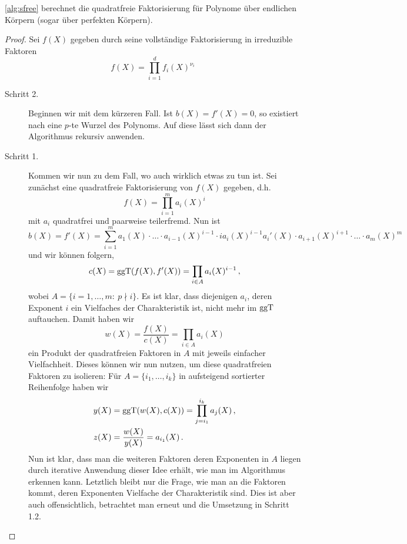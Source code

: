 \begin{thm}
  \autoref{alg:sfree} berechnet die quadratfreie Faktorisierung für Polynome
  über endlichen Körpern (sogar über perfekten Körpern).
\end{thm}
\begin{proof}
  Sei $f(X)$ gegeben durch seine vollständige Faktorisierung in irreduzible
  Faktoren 
  \[ f(X) = \prod_{i=1}^d f_i(X)^{\nu_i}\]
  \begin{description}
    \item[Schritt 2.] Beginnen wir mit dem kürzeren Fall.
      Ist $b(X) = f'(X) = 0$, so existiert nach  eine
      $p$-te Wurzel des Polynoms. Auf diese lässt sich dann der Algorithmus
      rekursiv anwenden.
    \item[Schritt 1.] Kommen wir nun zu dem Fall, wo auch wirklich etwas zu tun
      ist. Sei zunächst eine quadratfreie Faktorisierung von $f(X)$ gegeben,
      d.h.
      \[ f(X) = \prod_{i=1}^m a_i(X)^i \]
      mit $a_i$ quadratfrei und paarweise teilerfremd.
      Nun ist
      \[ b(X) = f'(X) = \sum_{i=1}^m a_1(X) \cdot \ldots\cdot a_{i-1}(X)^{i-1}
        \cdot i a_i(X)^{i-1} a_i'(X)\cdot a_{i+1}(X)^{i+1}\cdot\ldots\cdot
        a_m(X)^m\]
      und wir können folgern, 
      \[ c(X) = \operatorname{ggT}(f(X),f'(X)) = \prod_{i\in A} a_i(X)^{i-1}\,,\]
      wobei $A = \{i=1,\ldots,m:\ p\nmid i\}$. Es ist klar, dass diejenigen
      $a_i$, deren Exponent $i$ ein Vielfaches der Charakteristik ist,
      nicht mehr im $\operatorname{ggT}$ auftauchen. Damit haben wir
      \[ w(X) = \frac{f(X)}{c(X)} = \prod_{i\in A} a_i(X) \]
      ein Produkt der quadratfreien Faktoren in $A$ mit jeweils einfacher
      Vielfachheit. Dieses können wir nun nutzen, um diese quadratfreien Faktoren
      zu isolieren: Für $A = \{i_1,\ldots,i_k\}$ in aufsteigend sortierter
      Reihenfolge haben wir
      \begin{align*}
        y(X) &= \operatorname{ggT}(w(X),c(X)) = \prod_{j=i_1}^{i_k} a_j(X)\,,\\
        z(X) &= \frac{w(X)}{y(X)} = a_{i_1}(X)\,.
      \end{align*}
      Nun ist klar, dass man die weiteren Faktoren deren Exponenten in $A$
      liegen durch iterative Anwendung dieser Idee erhält, wie man im 
      Algorithmus erkennen kann. Letztlich bleibt nur die Frage, wie man an die
      Faktoren kommt, deren Exponenten Vielfache der Charakteristik sind.
      Dies ist aber auch offensichtlich, betrachtet man erneut
       und die Umsetzung in Schritt 1.2. 
  \end{description}
\end{proof}
